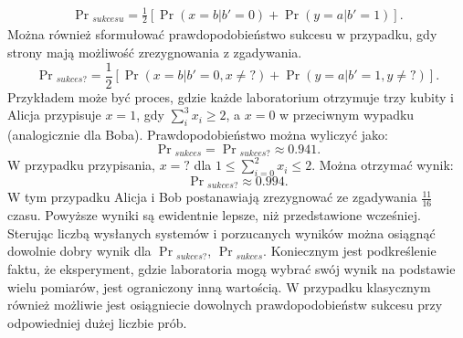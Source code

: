 \documentclass[10pt]{article} %
\begin{document}
\begin{equation}
\begin{split}
\Pr{}_{sukcesu} = \frac{1}{2} \left[ \Pr(x=b|b'=0) + \Pr(y=a|b' = 1)\right].
\end{split}
\end{equation}
Można również sformułować prawdopodobieństwo sukcesu w przypadku, gdy strony mają możliwość zrezygnowania z zgadywania. %
\begin{equation}
\Pr{}_{sukces?} = \frac{1}{2} \left[ \Pr(x=b|b'=0, x\neq?) + \Pr(y=a|b' = 1, y\neq?)\right].
\end{equation} Przykładem może być proces, gdzie każde laboratorium otrzymuje trzy kubity i Alicja przypisuje $x=1$, gdy $\sum_i^3 x_i \geq 2$, a $x=0$ w przeciwnym wypadku (analogicznie dla Boba). Prawdopodobieństwo można wyliczyć jako:
\begin{equation}
\Pr{}_{sukces} = \Pr{}_{sukces?} \approx 0.941.
\end{equation} W przypadku przypisania, $x=?$ dla $1 \leq \sum_{i=0}^2 x_i \leq 2$. Można otrzymać wynik:
\begin{equation}
\Pr{}_{sukces?} \approx 0.994.
\end{equation}
W tym przypadku Alicja i Bob postanawiają zrezygnować ze zgadywania $\frac{11}{16}$ czasu. Powyższe wyniki są ewidentnie lepsze, niż przedstawione wcześniej. Sterując liczbą wysłanych systemów i porzucanych wyników można osiągnąć dowolnie dobry wynik dla $\Pr{}_{sukces?}$, $\Pr{}_{sukces}$. Koniecznym jest podkreślenie faktu, że eksperyment, gdzie laboratoria mogą wybrać swój wynik na podstawie wielu pomiarów, jest ograniczony inną wartością.
W przypadku klasycznym również możliwie jest osiągniecie dowolnych prawdopodobieństw sukcesu przy odpowiedniej dużej liczbie prób.
\end{document}
